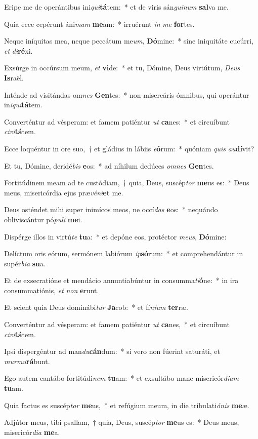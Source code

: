 \item Eripe me de operántibus ini\textit{qui}\textbf{tá}tem:~* et de viris sán\textit{gui}\textit{num} \textbf{sal}va me.
\item Quia ecce cepérunt áni\textit{mam} \textbf{me}am:~* irruérunt \textit{in} \textit{me} \textbf{for}tes.
\item Neque iníquitas mea, neque peccátum me\textit{um}, \textbf{Dó}mine:~* sine iniquitáte cucúrri, \textit{et} \textit{di}\textbf{ré}xi.
\item Exsúrge in occúrsum meum, \textit{et} \textbf{vi}de:~* et tu, Dómine, Deus virtútum, \textit{De}\textit{us} \textbf{Is}raël.
\item Inténde ad visitándas om\textit{nes} \textbf{Gen}tes:~* non misereáris ómnibus, qui operántur in\textit{i}\textit{qui}\textbf{tá}tem.
\item Converténtur ad vésperam: et famem patiéntur \textit{ut} \textbf{ca}nes:~* et circuíbunt \textit{ci}\textit{vi}\textbf{tá}tem.
\item Ecce loquéntur in ore suo,~† et gládius in lábiis \textit{e}\textbf{ó}rum:~* quóniam \textit{quis} \textit{au}\textbf{dí}vit?
\item Et tu, Dómine, deridé\textit{bis} \textbf{e}os:~* ad níhilum dedúces \textit{om}\textit{nes} \textbf{Gen}tes.
\item Fortitúdinem meam ad te custódiam,~† quia, Deus, suscép\textit{tor} \textbf{me}us es:~* Deus meus, misericórdia ejus præ\textit{vé}\textit{ni}\textbf{et} me.
\item Deus osténdet mihi super inimícos meos, ne occí\textit{das} \textbf{e}os:~* nequándo obliviscántur pó\textit{pu}\textit{li} \textbf{me}i.
\item Dispérge illos in virtú\textit{te} \textbf{tu}a:~* et depóne eos, protéctor \textit{me}\textit{us}, \textbf{Dó}mine:
\item Delíctum oris eórum, sermónem labiórum \textit{ip}\textbf{só}rum:~* et comprehendántur in supér\textit{bi}\textit{a} \textbf{su}a.
\item Et de exsecratióne et mendácio annuntiabúntur in consumma\textit{ti}\textbf{ó}ne:~* in ira consummatiónis, \textit{et} \textit{non} \textbf{e}runt.
\item Et scient quia Deus dominábi\textit{tur} \textbf{Ja}cob:~* et fí\textit{ni}\textit{um} \textbf{ter}ræ.
\item Converténtur ad vésperam: et famem patiéntur \textit{ut} \textbf{ca}nes,~* et circuíbunt \textit{ci}\textit{vi}\textbf{tá}tem.
\item Ipsi dispergéntur ad man\textit{du}\textbf{cán}dum:~* si vero non fúerint saturáti, et \textit{mur}\textit{mu}\textbf{rá}bunt.
\item Ego autem cantábo fortitúdi\textit{nem} \textbf{tu}am:~* et exsultábo mane misericór\textit{di}\textit{am} \textbf{tu}am.
\item Quia factus es suscép\textit{tor} \textbf{me}us,~* et refúgium meum, in die tribulati\textit{ó}\textit{nis} \textbf{me}æ.
\item Adjútor meus, tibi psallam,~† quia, Deus, suscép\textit{tor} \textbf{me}us es:~* Deus meus, misericór\textit{di}\textit{a} \textbf{me}a.
